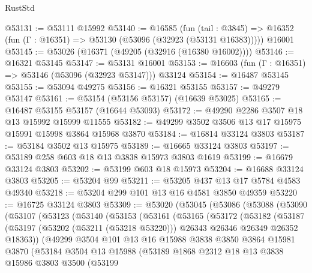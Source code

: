 \begin{lexlean}{RustStd}
\begin{coremodule}
@53131 := @53111 @15992
@53140 := @16585
    (fun (tail : @3845) => @16352 (fun (Γ : @16351) => @53130 (@53096 (@32923 (@53131 @16383)))))
    @16001
@53145 := @53026 (@16371 (@49205 (@32916 (@16380 @16002))))
@53146 := @16321 @53145
@53147 := @53131 @16001
@53153 := @16603 (fun (Γ : @16351) => @53146 (@53096 (@32923 @53147))) @33124
@53154 := @16487 @53145
@53155 := @53094 @49275
@53156 := @16321 @53155
@53157 := @49279 @53147
@53161 := @53154 (@53156 @53157) (@16639 @53025)
@53165 := @16487 @53155 @53157 (@16644 @53093)
@53172 := @49290 @2286 @3507 @18 @13 @15992 @15999 @11555
@53182 := @49299 @3502 @3506 @13 @17 @15975 @15991 @15998 @3864 @15968 @3870
@53184 := @16814 @33124 @3803
@53187 := @53184 @3502 @13 @15975
@53189 := @16665 @33124 @3803
@53197 := @53189 @258 @603 @18 @13 @3838 @15973 @3803 @1619
@53199 := @16679 @33124 @3803
@53202 := @53199 @603 @18 @15973
@53204 := @16688 @33124 @3803
@53205 := @53204 @99
@53211 := @53205 @437 @13 @17 @5784 @4583 @49340
@53218 := @53204 @299 @101 @13 @16 @4581 @3850 @49359
@53220 := @16725 @33124 @3803
@53309 := @53020
    (@53045
      (@53086
        (@53088
          (@53090
            (@53107
              (@53123
                (@53140
                  (@53153
                    (@53161
                      (@53165
                        (@53172
                          (@53182
                            (@53187
                              (@53197
                                (@53202 (@53211 (@53218 @53220)))
                                @26343
                                @26346
                                @26349
                                @26352
                                @18363))
                            (@49299
                              @3504
                              @101
                              @13
                              @16
                              @15988
                              @3838
                              @3850
                              @3864
                              @15981
                              @3870
                              (@53184
                                @3504
                                @13
                                @15988
                                (@53189
                                  @1868
                                  @2312
                                  @18
                                  @13
                                  @3838
                                  @15986
                                  @3803
                                  @3500
                                  (@53199

\end{coremodule}
\end{lexlean}
